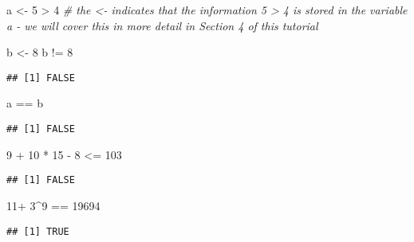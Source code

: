 \documentclass[
]{book}
\newenvironment{Shaded}{\begin{snugshade}}{\end{snugshade}}
\newcommand{\CommentTok}[1]{\textcolor[rgb]{0.56,0.35,0.01}{\textit{#1}}}
\newcommand{\DecValTok}[1]{\textcolor[rgb]{0.00,0.00,0.81}{#1}}
\newcommand{\NormalTok}[1]{#1}
\newcommand{\OtherTok}[1]{\textcolor[rgb]{0.56,0.35,0.01}{#1}}
\newcommand{\SpecialCharTok}[1]{\textcolor[rgb]{0.00,0.00,0.00}{#1}}
\begin{document}
\begin{Shaded}
\begin{Highlighting}[]
\NormalTok{a }\OtherTok{\textless{}{-}} \DecValTok{5} \SpecialCharTok{\textgreater{}} \DecValTok{4} 
    \CommentTok{\# the \textless{}{-} indicates that the information 5 \textgreater{} 4 is stored in the variable a {-} we will cover this in more detail in Section 4 of this tutorial}
\end{Highlighting}
\end{Shaded}

\begin{Shaded}
\begin{Highlighting}[]
\NormalTok{b }\OtherTok{\textless{}{-}} \DecValTok{8}
\NormalTok{b }\SpecialCharTok{!=} \DecValTok{8}
\end{Highlighting}
\end{Shaded}

\begin{verbatim}
## [1] FALSE
\end{verbatim}

\begin{Shaded}
\begin{Highlighting}[]
\NormalTok{a }\SpecialCharTok{==}\NormalTok{ b}
\end{Highlighting}
\end{Shaded}

\begin{verbatim}
## [1] FALSE
\end{verbatim}

\begin{Shaded}
\begin{Highlighting}[]
\DecValTok{9} \SpecialCharTok{+} \DecValTok{10} \SpecialCharTok{*} \DecValTok{15} \SpecialCharTok{{-}} \DecValTok{8} \SpecialCharTok{\textless{}=} \DecValTok{103}
\end{Highlighting}
\end{Shaded}

\begin{verbatim}
## [1] FALSE
\end{verbatim}

\begin{Shaded}
\begin{Highlighting}[]
\DecValTok{11}\SpecialCharTok{+} \DecValTok{3}\SpecialCharTok{\^{}}\DecValTok{9} \SpecialCharTok{==} \DecValTok{19694}
\end{Highlighting}
\end{Shaded}

\begin{verbatim}
## [1] TRUE
\end{verbatim}
\end{document}
